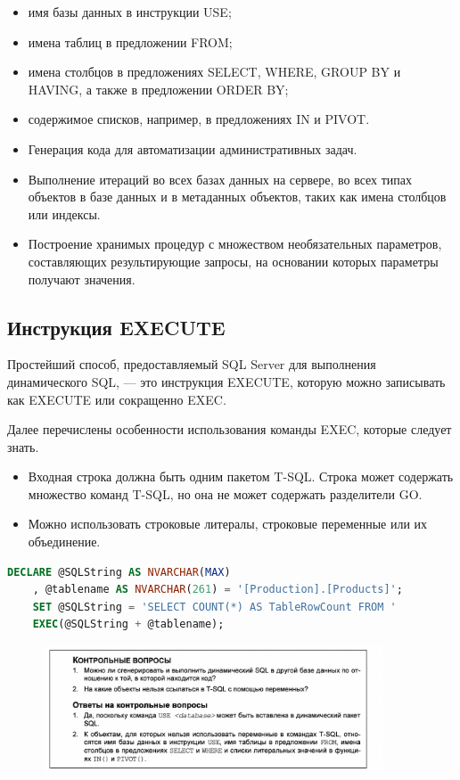 \begin{itemize}
	\item имя базы данных в инструкции USE; 
	\item имена таблиц в предложении FROM; 
	\item  имена столбцов в предложениях SELECT, WHERE, GROUP BY и HAVING, а также в предложении ORDER BY; 
	\item содержимое списков, например, в предложениях IN и PIVOT. 
	\item Генерация кода для автоматизации административных задач. 
	\item Выполнение итераций во всех базах данных на сервере, во всех типах объектов
	в базе данных и в метаданных объектов, таких как имена столбцов или индексы. 
	\item Построение хранимых процедур с множеством необязательных параметров, составляющих результирующие запросы, на основании которых параметры получают значения.
\end{itemize}


\subsection{Инструкция EXECUTE}
Простейший способ, предоставляемый SQL Server для выполнения динамического
SQL, — это инструкция EXECUTE, которую можно записывать как EXECUTE или сокращенно EXEC.

Далее перечислены особенности использования команды EXEC, которые следует знать.

\begin{itemize}
	\item Входная строка должна быть одним пакетом T-SQL. Строка может содержать
	множество команд T-SQL, но она не может содержать разделители GO. 
	\item Можно использовать строковые литералы, строковые переменные или их объединение. 
\end{itemize}


\begin{lstlisting}[label=lst:funcReturn, language=sql]
	DECLARE @SQLString AS NVARCHAR(MAX)
	, @tablename AS NVARCHAR(261) = '[Production].[Products]';
   	SET @SQLString = 'SELECT COUNT(*) AS TableRowCount FROM '
   	EXEC(@SQLString + @tablename);
\end{lstlisting}


\begin{figure}[h!]
	\begin{center}
		\includegraphics[width=0.9\textwidth]{img/control35.png}
	\end{center}
	\captionsetup{justification=centering}
\end{figure}


